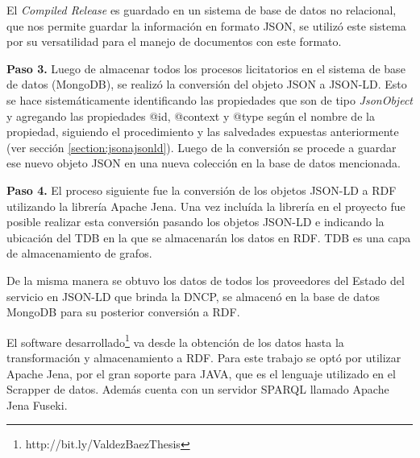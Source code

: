 El \textit{Compiled Release} es guardado en un sistema de base de datos no relacional, que nos permite guardar la información en formato JSON, se utilizó este sistema por su versatilidad para el manejo de documentos con este formato.

\textbf{Paso 3.} Luego de almacenar todos los procesos licitatorios en el sistema de base de datos (MongoDB), se realizó la conversión del objeto JSON a JSON-LD. Esto se hace sistemáticamente identificando las propiedades que son de tipo \textit{JsonObject} y agregando las propiedades @id, @context y @type según el nombre de la propiedad, siguiendo el procedimiento y las salvedades expuestas anteriormente (ver sección \ref{section:jsonajsonld}). Luego de la conversión se procede a guardar ese nuevo objeto JSON en una nueva colección en la base de datos mencionada.

\textbf{Paso 4.} El proceso siguiente fue la conversión de los objetos JSON-LD a RDF utilizando la librería Apache Jena. Una vez incluída la librería en el proyecto fue posible realizar esta conversión pasando los objetos JSON-LD e indicando la ubicación del TDB en la que se almacenarán los datos en RDF. TDB es una capa de almacenamiento de grafos.

De la misma manera se obtuvo los datos de todos los proveedores del Estado del servicio en JSON-LD que brinda la DNCP, se almacenó en la base de datos MongoDB para su posterior conversión a RDF. 

El software desarrollado\footnote{http://bit.ly/ValdezBaezThesis} va desde la obtención de los datos hasta la transformación y almacenamiento a RDF. Para este trabajo se optó por utilizar Apache Jena, por el gran soporte para JAVA, que es el lenguaje utilizado en el Scrapper de datos. Además cuenta con un servidor SPARQL llamado Apache Jena Fuseki.


